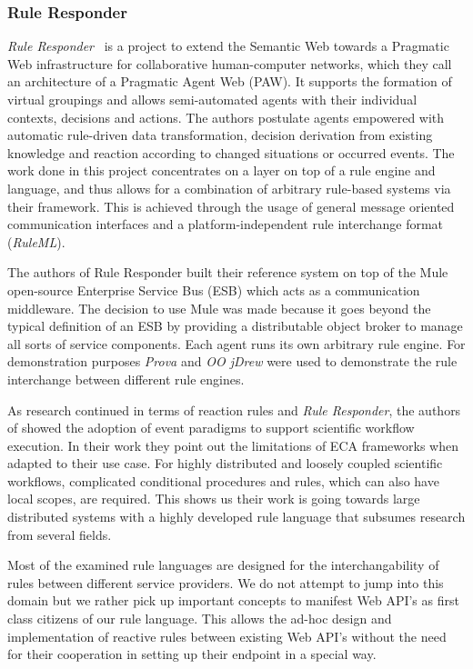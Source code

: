 \subsubsection{Rule Responder}
\emph{Rule Responder}~\cite{2007-Paschke_etal-RuleResponder.pdf} is a project to extend the Semantic Web towards a Pragmatic Web infrastructure for collaborative human-computer networks, which they call an architecture of a Pragmatic Agent Web (PAW). It supports the formation of virtual groupings and allows semi-automated agents with their individual contexts, decisions and actions. The authors postulate agents empowered with automatic rule-driven data transformation, decision derivation from existing knowledge and reaction according to changed situations or occurred events. The work done in this project concentrates on a layer on top of a rule engine and language, and thus allows for a combination of arbitrary rule-based systems via their framework. This is achieved through the usage of general message oriented communication interfaces and a platform-independent rule interchange format (\emph{RuleML}).

The authors of Rule Responder built their reference system on top of the Mule open-source Enterprise Service Bus (ESB) which acts as a communication middleware. The decision to use Mule was made because it goes beyond the typical definition of an ESB by providing a distributable object broker to manage all sorts of service components. Each agent runs its own arbitrary rule engine. For demonstration purposes \emph{Prova} and \emph{OO jDrew} were used to demonstrate the rule interchange between different rule engines.

As research continued in terms of reaction rules and \textit{Rule Responder}, the authors of \cite{2013_Zhao-Paschke_EDSWE.pdf} showed the adoption of event paradigms to support scientific workflow execution. In their work they point out the limitations of ECA frameworks when adapted to their use case. For highly distributed and loosely coupled scientific workflows, complicated conditional procedures and rules, which can also have local scopes, are required. This shows us their work is going towards large distributed systems with a highly developed rule language that subsumes research from several fields.


Most of the examined rule languages are designed for the interchangability of rules between different service providers. We do not attempt to jump into this domain but we rather pick up important concepts to manifest Web API's as first class citizens of our rule language. This allows the ad-hoc design and implementation of reactive rules between existing Web API's without the need for their cooperation in setting up their endpoint in a special way.

